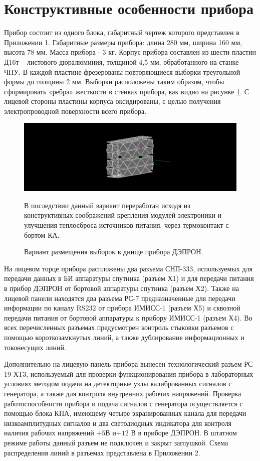 \section{Конструктивные особенности прибора}

Прибор состоит из одного блока, габаритный чертеж которого представлен в Приложении 1. Габаритные размеры прибора: длина  280 мм, ширина 160 мм, высота 78 мм. Масса прибора - 3 кг. Корпус прибора составлен из шести пластин Д16т -- листового дюралюминия, толщиной 4,5 мм, обработанного на станке ЧПУ. В каждой пластине фрезерованы повторяющиеся выборки треугольной формы до толщины 2 мм. Выборки расположены таким образом, чтобы сформировать «ребра» жесткости в стенках прибора, как видно на рисунке \ref{fig:viborki}. С лицевой стороны пластины корпуса оксидированы, с целью получения электропроводной поверхности всего прибора.

\begin{figure}
\centering
\includegraphics[width=0.7\linewidth]{images/viborki}
\caption{ Вариант размещения выборок в днище прибора ДЭПРОН.}
\medskip
{\small В последствии данный вариант переработан исходя из конструктивных соображений крепления модулей электроники и улучшения теплосброса источников питания, через термоконтакт с бортом КА. }
\label{fig:viborki}
\end{figure}


На лицевом торце прибора распложены два разъема СНП-333, используемых для передачи данных в БИ аппаратуры спутника (разъем Х1) и для передачи питания в прибор ДЭПРОН от бортовой аппаратуры спутника (разъем Х2). Также на лицевой панели находятся два разъема РС-7 предназначенные для передачи информации по каналу RS232 от прибора ИМИСС-1 (разъем Х5) и сквозной передачи питания от бортовой аппаратуры к прибору ИМИСС-1 (разъем Х4). Во всех перечисленных разъемах предусмотрен контроль стыковки разъемов с помощью короткозамкнутых линий, а также дублирование информационных и токонесущих линий.


Дополнительно на лицевую панель прибора вынесен технологический разъем РС 19 ХТ3, используемый для проверки функционирования прибора в лабораторных условиях методом подачи на детекторные узлы калиброванных сигналов с генератора, а также для контроля внутренних рабочих напряжений. Проверка работоспособности прибора и подача сигналов с генератора осуществляется с помощью  блока КПА, имеющему четыре экранированных канала для передачи низкоамплитудных сигналов и два светодиодных индикатора для контроля наличия рабочих напряжений  $ +5  $В и$  +12 $ В в приборе ДЭПРОН.  В штатном режиме работы данный разъем не подключен и закрыт заглушкой. Схема распределения линий в разъемах представлена в Приложении 2.

